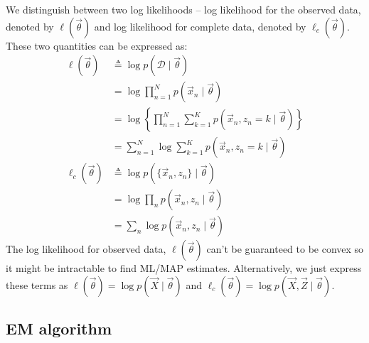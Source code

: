We distinguish between two log likelihoods -- log likelihood for the observed data, denoted by $\ell(\vec \theta)$ and log likelihood for complete data, denoted by $\ell_c(\vec \theta)$. These two quantities can be expressed as:
\begin{align}
    \ell(\vec \theta)   &\triangleq \log p(\mathcal D \mid \vec \theta) \nonumber\\
                        &= \log \prod_{n = 1}^N p(\vec x_n \mid \vec \theta)\nonumber\\
                        &= \log \left\{\prod_{n = 1}^N \sum_{k = 1}^K p(\vec x_n, z_n = k \mid \vec \theta)\right\} \nonumber\\
                        &= \sum_{n = 1}^N \log \sum_{k = 1}^K p(\vec x_n, z_n = k \mid \vec \theta)\\
    \ell_c(\vec \theta) &\triangleq \log p\left(\{\vec x_n, z_n\} \mid \vec \theta\right) \nonumber\\
                        &= \log \prod_n p(\vec x_n, z_n \mid \vec \theta) \nonumber\\
                        &= \sum_n \log p(\vec x_n, z_n \mid \vec \theta)
\end{align}
The log likelihood for observed data, $\ell(\vec \theta)$ can't be guaranteed to be convex so it might be intractable to find ML/MAP estimates. Alternatively, we just express these terms as $\ell(\vec \theta) = \log p(\vec X \mid \vec \theta)$ and $\ell_c(\vec \theta) = \log p (\vec X, \vec Z \mid \vec \theta)$.

\subsection{EM algorithm}
